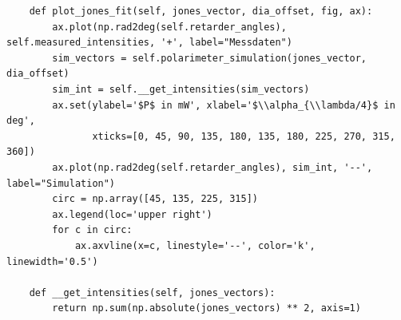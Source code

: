 \documentclass[a4paper, titlepage,  ngerman]{book}
\begin{document}
\begin{verbatim}
    def plot_jones_fit(self, jones_vector, dia_offset, fig, ax):
        ax.plot(np.rad2deg(self.retarder_angles), self.measured_intensities, '+', label="Messdaten")
        sim_vectors = self.polarimeter_simulation(jones_vector, dia_offset)
        sim_int = self.__get_intensities(sim_vectors)
        ax.set(ylabel='$P$ in mW', xlabel='$\\alpha_{\\lambda/4}$ in deg',
               xticks=[0, 45, 90, 135, 180, 135, 180, 225, 270, 315, 360])
        ax.plot(np.rad2deg(self.retarder_angles), sim_int, '--', label="Simulation")
        circ = np.array([45, 135, 225, 315])
        ax.legend(loc='upper right')
        for c in circ:
            ax.axvline(x=c, linestyle='--', color='k', linewidth='0.5')

    def __get_intensities(self, jones_vectors):
        return np.sum(np.absolute(jones_vectors) ** 2, axis=1)

\end{verbatim}
\end{document}
